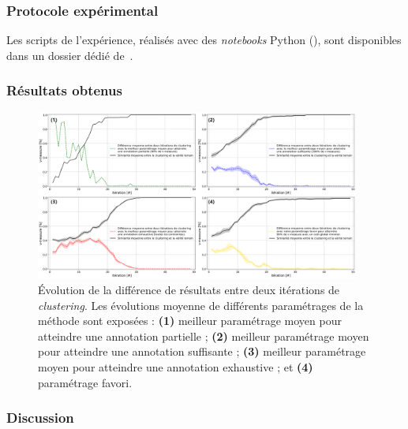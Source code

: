 	
		\subsubsection{Protocole expérimental}
			
			
			\begin{leftBarInformation}
				Les scripts de l'expérience, réalisés avec des \textit{notebooks} Python (\cite{van-rossum-drake:2009:python-reference-manual}), sont disponibles dans un dossier dédié de~\cite{schild:2021:cognitivefactory-interactiveclusteringcomparativestudy}.
			\end{leftBarInformation}

		\subsubsection{Résultats obtenus}
		
			
			\begin{figure}[!htb]
				\centering
				\includegraphics[width=0.95\textwidth]{figures/etude-rentabilite-similarite-clustering}
				\caption{Évolution de la différence de résultats entre deux itérations de \textit{clustering}.
				Les évolutions moyenne de différents paramétrages de la méthode sont exposées :
				\textbf{(1)} meilleur paramétrage moyen pour atteindre une annotation partielle ;
				\textbf{(2)} meilleur paramétrage moyen pour atteindre une annotation suffisante ;
				\textbf{(3)} meilleur paramétrage moyen pour atteindre une annotation exhaustive ;
				et \textbf{(4)} paramétrage favori.
				}
				\label{figure:4.5.2-ETUDE-RENTABILITE-SIMILARITE-CLUSTERING}
			\end{figure}

		\subsubsection{Discussion}
		
			
